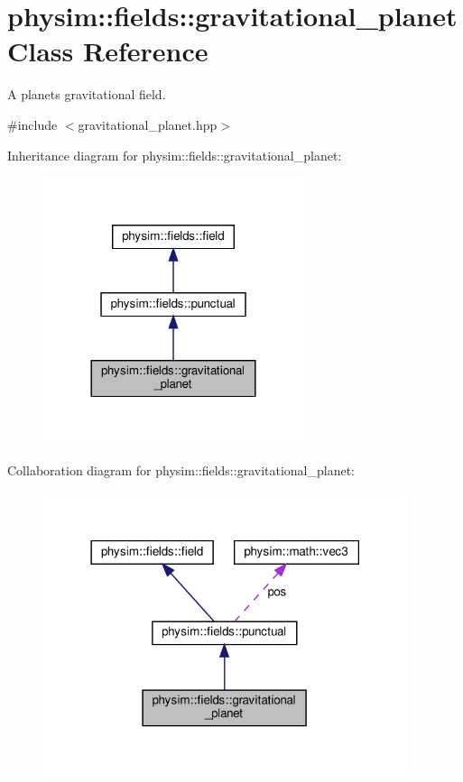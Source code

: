 \hypertarget{classphysim_1_1fields_1_1gravitational__planet}{}\section{physim\+:\+:fields\+:\+:gravitational\+\_\+planet Class Reference}
\label{classphysim_1_1fields_1_1gravitational__planet}


A planet\textquotesingle{}s gravitational field.  




{\ttfamily \#include $<$gravitational\+\_\+planet.\+hpp$>$}



Inheritance diagram for physim\+:\+:fields\+:\+:gravitational\+\_\+planet\+:\nopagebreak
\begin{figure}[H]
\begin{center}
\leavevmode
\includegraphics[width=216pt]{classphysim_1_1fields_1_1gravitational__planet__inherit__graph}
\end{center}
\end{figure}


Collaboration diagram for physim\+:\+:fields\+:\+:gravitational\+\_\+planet\+:\nopagebreak
\begin{figure}[H]
\begin{center}
\leavevmode
\includegraphics[width=302pt]{classphysim_1_1fields_1_1gravitational__planet__coll__graph}
\end{center}
\end{figure}
